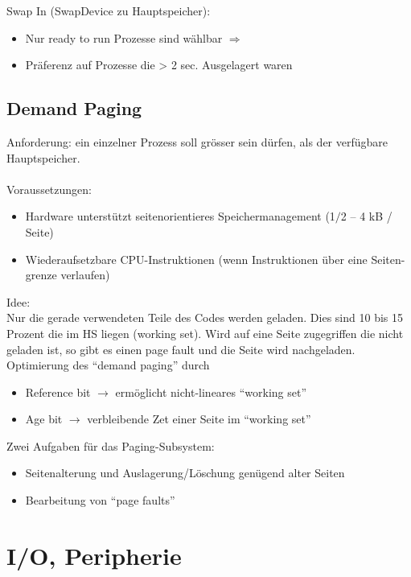 \documentclass[a4paper, 10pt]{article}
\begin{document}
Swap In (SwapDevice zu Hauptspeicher):
\begin{itemize}
\item Nur ready to run Prozesse sind w\"ahlbar $\Rightarrow$
\item Pr\"aferenz auf Prozesse die > 2 sec. Ausgelagert waren
\end{itemize}

\subsection{Demand Paging}
Anforderung: ein einzelner Prozess soll gr\"osser sein d\"urfen, als der
verf\"ugbare Hauptspeicher.\\
\\
Voraussetzungen:
\begin{itemize}
\item Hardware unterst\"utzt seitenorientieres Speichermanagement (1$/$2 $–$ 4 kB / Seite)
\item Wiederaufsetzbare CPU-Instruktionen (wenn Instruktionen \"uber eine Seiten-
grenze verlaufen)
\end{itemize}

Idee:\\
Nur die gerade verwendeten Teile des Codes werden geladen. Dies sind 10 bis 15 
Prozent die im HS liegen (working set). Wird auf eine Seite zugegriffen die nicht geladen ist, so gibt es einen page fault und die Seite wird nachgeladen.\\

Optimierung des “demand paging” durch
\begin{itemize}
\item Reference bit $\rightarrow$ erm\"oglicht nicht-lineares “working set”
\item Age bit $\rightarrow$ verbleibende Zet einer Seite im “working set”
\end{itemize}
Zwei Aufgaben f\"ur das Paging-Subsystem:
\begin{itemize}
\item Seitenalterung und Auslagerung/L\"oschung gen\"ugend alter Seiten
\item Bearbeitung von “page faults”
\end{itemize}

\newpage
\section{I/O, Peripherie}
\end{document}
